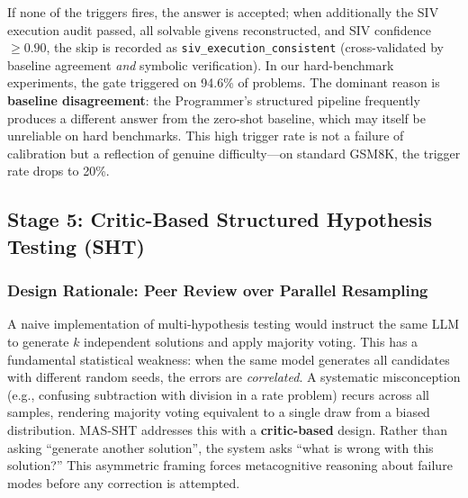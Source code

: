 \documentclass[11pt,a4paper]{article}
\begin{document}
If none of the triggers fires, the answer is accepted; when additionally the SIV execution audit passed, all solvable givens reconstructed, and SIV confidence $\geq 0.90$, the skip is recorded as \texttt{siv\_execution\_consistent} (cross-validated by baseline agreement \emph{and} symbolic verification).
In our hard-benchmark experiments, the gate triggered on 94.6\% of problems.
The dominant reason is \textbf{baseline disagreement}: the Programmer's structured pipeline frequently produces a different answer from the zero-shot baseline, which may itself be unreliable on hard benchmarks.
This high trigger rate is not a failure of calibration but a reflection of genuine difficulty---on standard GSM8K, the trigger rate drops to 20\%.
\subsection{Stage 5: Critic-Based Structured Hypothesis Testing (SHT)}
\label{sec:sht}
\subsubsection{Design Rationale: Peer Review over Parallel Resampling}
A naive implementation of multi-hypothesis testing would instruct the same LLM to generate $k$ independent solutions and apply majority voting.
This has a fundamental statistical weakness: when the same model generates all candidates with different random seeds, the errors are \emph{correlated}.
A systematic misconception (e.g., confusing subtraction with division in a rate problem) recurs across all samples, rendering majority voting equivalent to a single draw from a biased distribution.
MAS-SHT addresses this with a \textbf{critic-based} design.
Rather than asking ``generate another solution'', the system asks ``what is wrong with this solution?''
This asymmetric framing forces metacognitive reasoning about failure modes before any correction is attempted.
\end{document}
